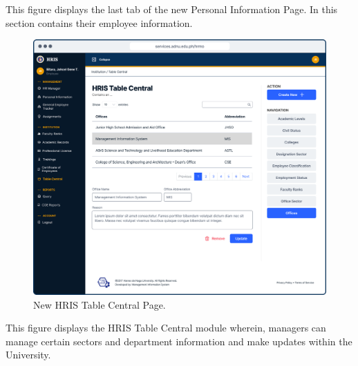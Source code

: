     This figure displays the last tab of the new Personal Information Page. In this section contains their employee information.

    \begin{figure}[H]
        \centering
        \includegraphics[width=1\linewidth]{figures/app/table-central.png}
        \caption{New HRIS Table Central Page.}
        \label{fig:app-table-central}
    \end{figure}

    This figure displays the HRIS Table Central module wherein, managers can manage certain sectors and department information and make updates within the University.

